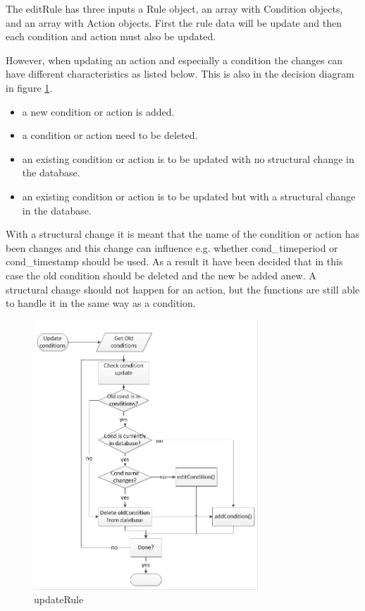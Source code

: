 The editRule has three inputs a Rule object, an array with Condition objects, and an array with Action objects. First the rule data will be update and then each condition and action must also be updated. 

However, when updating an action and especially a condition the changes can have different characteristics as listed below. This is also in the decision diagram in figure \ref{fig:updateRule}.

\begin{itemize}
	\item a new condition or action is added.
	\item a condition or action need to be deleted.
	\item an existing condition or action is to be updated with no structural change in the database.
	\item an existing condition or action is to be updated but with a structural change in the database.
\end{itemize}

With a structural change it is meant that the name of the condition or action has been changes and this change can influence e.g. whether cond\_timeperiod or cond\_timestamp should be used. As a result it have been decided that in this case the old condition should be deleted and the new be added anew. A structural change should not happen for an action, but the functions are still able to handle it in the same way as a condition.

\begin{figure}
	\centering
		\includegraphics[width=0.75\textwidth]{images/updateRule.jpg}
	\caption{updateRule}
	\label{fig:updateRule}
\end{figure}



